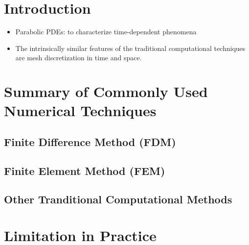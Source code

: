 \section{Introduction}

\begin{itemize}
  \item Parabolic PDEs: to characterize time-dependent phenomena
  \item The intrinsically similar features of the traditional computational techniques are mesh discretization in time and space.
\end{itemize}


\section{Summary of Commonly Used Numerical Techniques}

  \subsection{Finite Difference Method (FDM) \cite{grossmann2007numerical}}

  \subsection{Finite Element Method (FEM) \cite{zlamal1968finite}}

  
  \subsection{Other Tranditional Computational Methods}



\section{Limitation in Practice}
